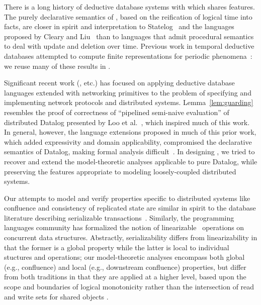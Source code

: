 There is a long history of deductive database systems with which \lang
shares features.
The purely declarative semantics of \lang, based on the reification of logical time into
facts, are closer in spirit and interpretation to  Statelog~\cite{statelog} and
the languages proposed by Cleary and Liu~\cite{harmful,deductiveupdates,starlog} than
to languages that admit procedural semantics~\cite{ldl, glue-nail} to deal with update 
and deletion over time.
Previous work in temporal deductive databases attempted to compute finite representations for periodic phenomena~\cite{tdd-infinite}: we reuse many of these results in \lang.

Significant recent work (\cite{boom-techr,Belaramani:2009,Chu:2007,Loo2009-CACM}, etc.) has focused on applying deductive database languages extended with networking 
primitives to the problem of specifying and implementing network protocols and distributed systems.  Lemma~\ref{lem:guarding} resembles the proof of correctness of ``pipelined
semi-naive evaluation'' of distributed Datalog presented by Loo et al.~\cite{loo-sigmod06},
which inspired much of this work.  In general, however, the language extensions 
proposed in much of this prior work,
which added
expressivity and domain applicability, compromised the declarative
semantics of Datalog, making formal analysis difficult~\cite{navarro, Mao2009}.
In designing \lang, we tried to recover and extend the model-theoretic analyses applicable
to pure Datalog, while preserving the features appropriate to modeling loosely-coupled
distributed systems.

Our attempts to model and verify properties specific to distributed systems like 
confluence and consistency of replicated state are similar in spirit to the database literature
describing serializable transactions~\cite{serializability}.  Similarly, the programming languages
community has formalized the notion of linearizable~\cite{linearizability} operations on
concurrent data structures.  Abstractly, serializability differs from linearizability in that the
former is a global property while the latter is local to individual stuctures and operations;
our model-theoretic analyses encompass both global (e.g., confluence) and local (e.g., downstream 
confluence) properties, but differ from both traditions in that they are applied at a higher
level, based upon the scope and boundaries of logical monotonicity rather than the intersection of read and write sets for shared objects .




